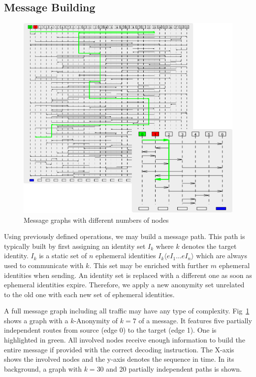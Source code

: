 \documentclass[runningheads]{llncs}
\begin{document}
\subsection{Message Building}
\begin{figure}[htb]
	\centering
	\includegraphics[width=0.8\columnwidth]{../msgGraph3}
	\caption{Message graphs with different numbers of nodes}
	\label{fig:mgsGraph}
\end{figure}

Using previously defined operations, we may build a message path. This path is typically built by first assigning an identity set $I_k$ where  $k$ denotes the target identity. $I_k$ is a static set of $n$ ephemeral identities $I_k\langle eI_1 \ldots eI_n\rangle$ which are always used to communicate with $k$. This set may be enriched with further $m$ ephemeral identities when sending. An identity set is replaced with a different one as soon as ephemeral identities expire. Therefore, we apply a new anonymity set unrelated to the old one with each new set of ephemeral identities.

A full message graph including all traffic may have any type of complexity. Fig~\ref{fig:mgsGraph} shows a graph with a $k$-Anonymity of $k=7$ of a message. It features five partially independent routes from source (edge 0) to the target (edge 1). One is highlighted in green. All involved nodes receive enough information to build the entire message if provided with the correct decoding instruction. The X-axis shows the involved nodes and the y-axis denotes the sequence in time. In its background, a graph with $k=30$ and 20 partially independent paths is shown.
\end{document}
